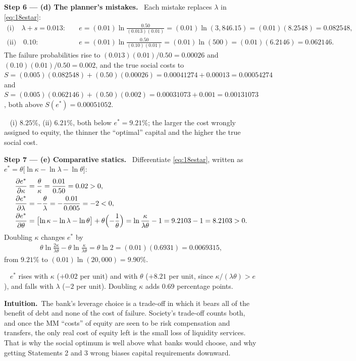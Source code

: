 \documentclass[11pt,a4paper]{article}
\numberwithin{equation}{section}
\newcommand{\step}[2]{\par\smallskip\noindent\textbf{Step #1 --- #2.}~}
\newcommand{\intuition}{\par\smallskip\noindent\textbf{Intuition.}~}
\newcommand{\answer}[1]{\par\smallskip\noindent\fbox{\textbf{Answer #1.}}~}
\begin{document}
\step{6}{(d) The planner's mistakes} Each mistake replaces $\lambda$ in \eqref{eq:18estar}:
\begin{align}
  \text{(i)}\quad \lambda+s=0.013:&\quad e=(0.01)\ln\frac{0.50}{(0.013)(0.01)}=(0.01)\ln(3{,}846.15)=(0.01)(8.2548)=0.082548, \nonumber\\
  \text{(ii)}\quad 0.10:&\quad e=(0.01)\ln\frac{0.50}{(0.10)(0.01)}=(0.01)\ln(500)=(0.01)(6.2146)=0.062146. \nonumber
\end{align}
The failure probabilities rise to $(0.013)(0.01)/0.50=0.00026$ and $(0.10)(0.01)/0.50=0.002$, and the
true social costs to $S=(0.005)(0.082548)+(0.50)(0.00026)=0.00041274+0.00013=0.00054274$ and
$S=(0.005)(0.062146)+(0.50)(0.002)=0.00031073+0.001=0.00131073$, both above $S(e^*)=0.00051052$.
\answer{(d)} (i) $8.25\%$, (ii) $6.21\%$, both below $e^*=9.21\%$; the larger the cost wrongly assigned
to equity, the thinner the ``optimal'' capital and the higher the true social cost.

\step{7}{(e) Comparative statics} Differentiate \eqref{eq:18estar}, written as
$e^*=\theta\bigl[\ln\kappa-\ln\lambda-\ln\theta\bigr]$:
\begin{align}
  \frac{\partial e^*}{\partial\kappa} &= \frac{\theta}{\kappa}=\frac{0.01}{0.50}=0.02>0, \nonumber\\
  \frac{\partial e^*}{\partial\lambda} &= -\frac{\theta}{\lambda}=-\frac{0.01}{0.005}=-2<0, \nonumber\\
  \frac{\partial e^*}{\partial\theta} &= \bigl[\ln\kappa-\ln\lambda-\ln\theta\bigr]+\theta\Bigl(-\frac1\theta\Bigr)=\ln\frac{\kappa}{\lambda\theta}-1=9.2103-1=8.2103>0. \nonumber
\end{align}
Doubling $\kappa$ changes $e^*$ by
\begin{align}
  \theta\ln\frac{2\kappa}{\lambda\theta}-\theta\ln\frac{\kappa}{\lambda\theta}=\theta\ln2=(0.01)(0.6931)=0.0069315, \nonumber
\end{align}
from $9.21\%$ to $(0.01)\ln(20{,}000)=9.90\%$.
\answer{(e)} $e^*$ rises with $\kappa$ ($+0.02$ per unit) and with $\theta$ ($+8.21$ per unit, since
$\kappa/(\lambda\theta)>e$), and falls with $\lambda$ ($-2$ per unit). Doubling $\kappa$ adds $0.69$
percentage points.

\intuition The bank's leverage choice is a trade-off in which it bears all of the benefit of debt and
none of the cost of failure. Society's trade-off counts both, and once the MM ``costs'' of equity are
seen to be risk compensation and transfers, the only real cost of equity left is the small loss of
liquidity services. That is why the social optimum is well above what banks would choose, and why
getting Statements 2 and 3 wrong biases capital requirements downward.
\end{document}
